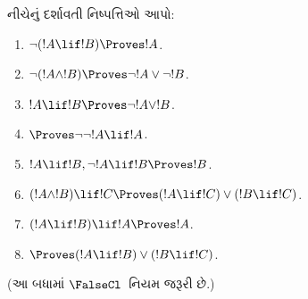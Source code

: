 \begin{prob}
નીચેનું દર્શાવતી નિષ્પત્તિઓ આપો:
\begin{enumerate}
\item $\lnot(!A \lif !B) \Proves !A$.
\item $\lnot(!A \land !B) \Proves \lnot !A \lor \lnot !B$.
\item $!A \lif !B \Proves \lnot !A \lor !B$.
\item $\Proves \lnot \lnot !A \lif !A$.
\item $!A \lif !B, \lnot !A \lif !B \Proves !B$.
\item $(!A \land !B) \lif !C \Proves (!A \lif !C) \lor (!B \lif !C)$.
\item $(!A \lif !B) \lif !A \Proves !A$.
\item $\Proves (!A \lif !B) \lor (!B \lif !C)$.
\end{enumerate}
(આ બધામાં $\FalseCl$~નિયમ જરૂરી છે.)
\end{prob}
\endgroup


%
  \begingroup
\makeatletter{}\makeatother


\label{guunit:OLP-0090}


